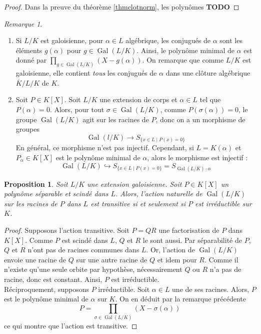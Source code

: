 \documentclass{article}
\DeclareMathOperator{\Gal}{Gal}
\newcommand{\todo}{\textbf{TODO}}
\theoremstyle{plain}
\newtheorem{proposition}[theorem]{Proposition}
\theoremstyle{definition}
\theoremstyle{remark}
\newtheorem*{remark}{Remarque}
\begin{document}
\begin{proof}
    Dans la preuve du théorème \ref{thmclotnorm}, les polynômes \todo
\end{proof}

\begin{remark} \leavevmode
    \begin{enumerate}
        \item Si $L/K$ est galoisienne, pour $\alpha \in L$ algébrique, les conjugués de $\alpha$ sont les éléments $g(\alpha)$ pour $g \in \Gal(L/K)$. Ainsi, le polynôme minimal de $\alpha$ est donné par $\prod\limits_{g \in\Gal(L/K)} (X-g(\alpha))$. On remarque que comme $L/K$ est galoisienne, elle contient \emph{tous} les conjugués de $\alpha$ dans une clôture algébrique $\overline{K}/L/K$ de $K$.
        \item Soit $P \in K[X]$. Soit $L/K$ une extension de corps et $\alpha \in L$ tel que $P(\alpha) = 0$. Alors, pour tout $\sigma \in \Gal(L/K)$, comme $P(\sigma(\alpha)) = 0$, le groupe $\Gal(L/K)$ agit sur les racines de $P$, donc on a un morphisme de groupes
        \[\Gal(l/K) \to S_{\{x \in L \mid P(x) = 0\}}\]
        En général, ce morphisme n'est pas injectif. Cependant, si $L = K(\alpha)$ et $P_\alpha \in K[X]$ est le polynôme minimal de $\alpha$, alors le morphisme est injectif :
        \[\Gal(L/K) \hookrightarrow S_{\{x \in L \mid P(x) = 0\}} = S_{\Gal(L/K) \cdot \alpha}\]
    \end{enumerate}
\end{remark}

\begin{proposition}
    Soit $L/K$ une extension galoisienne. Soit $P \in K[X]$ un polynôme séparable et scindé dans $L$. Alors, l'action naturelle de $\Gal(L/K)$ sur les racines de $P$ dans $L$ est transitive si et seulement si $P$ est irréductible sur $K$.
\end{proposition}

\begin{proof}
    Supposons l'action transitive. Soit $P = QR$ une factorisation de $P$ dans $K[X]$. Comme $P$ est scindé dans $L$, $Q$ et $R$ le sont aussi. Par séparabilité de $P$, $Q$ et $R$ n'ont pas de racines communes dans $L$. Or, l'action de $\Gal(L/K)$ envoie une racine de $Q$ sur une autre racine de $Q$ et idem pour $R$. Comme il n'existe qu'une seule orbite par hypothèse, nécessairement $Q$ ou $R$ n'a pas de racine, donc est constant. Ainsi, $P$ est irréductible. \\
    Réciproquement, supposons $P$ irréductible. Soit $\alpha \in L$ une de ses racines. Alors, $P$ est le polynôme minimal de $\alpha$ sur $K$. On en déduit par la remarque précédente
    \[P = \prod_{\sigma \in \Gal(L/K)} (X - \sigma(\alpha)) \]
    ce qui montre que l'action est transitive.
\end{proof}
\end{document}
